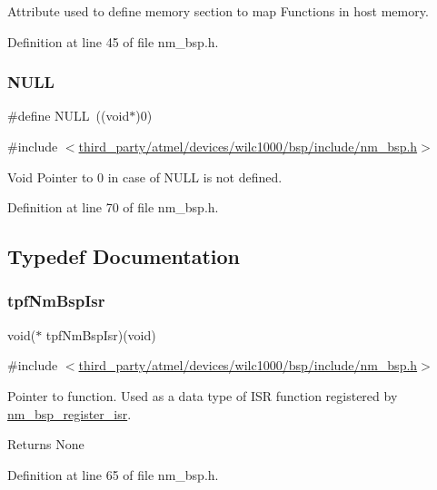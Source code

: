 Attribute used to define memory section to map Functions in host memory. 

Definition at line 45 of file nm\+\_\+bsp.\+h.

\mbox{\label{group__BSPDefine_ga070d2ce7b6bb7e5c05602aa8c308d0c4}} 
\subsubsection{\texorpdfstring{N\+U\+LL}{NULL}}
{\footnotesize\ttfamily \#define N\+U\+LL~((void$\ast$)0)}



{\ttfamily \#include $<$\hyperlink{nm__bsp_8h}{third\+\_\+party/atmel/devices/wilc1000/bsp/include/nm\+\_\+bsp.\+h}$>$}

Void Pointer to \textquotesingle{}0\textquotesingle{} in case of N\+U\+LL is not defined. 

Definition at line 70 of file nm\+\_\+bsp.\+h.



\subsection{Typedef Documentation}
\mbox{\label{group__BSPDefine_gab061a1639662a3114b4c8b3b39bd6848}} 
\subsubsection{\texorpdfstring{tpf\+Nm\+Bsp\+Isr}{tpfNmBspIsr}}
{\footnotesize\ttfamily void($\ast$ tpf\+Nm\+Bsp\+Isr)(void)}



{\ttfamily \#include $<$\hyperlink{nm__bsp_8h}{third\+\_\+party/atmel/devices/wilc1000/bsp/include/nm\+\_\+bsp.\+h}$>$}



Pointer to function. Used as a data type of I\+SR function registered by \hyperlink{group__NmBspRegisterFn_ga1b42af0f91da07772d2d5c871c9c3e62}{nm\+\_\+bsp\+\_\+register\+\_\+isr}. 

\begin{DoxyReturn}{Returns}
None 
\end{DoxyReturn}


Definition at line 65 of file nm\+\_\+bsp.\+h.

